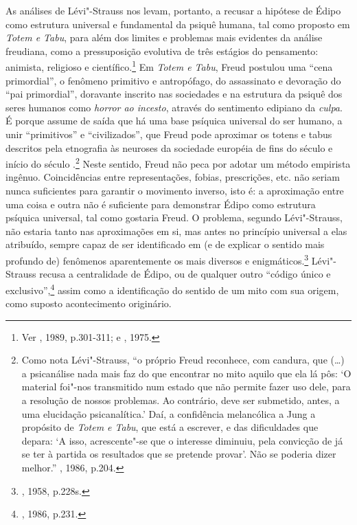 As análises de Lévi"-Strauss nos levam, portanto, a recusar a hipótese de
Édipo como estrutura universal e fundamental da psiquê humana, tal como
proposto em \emph{Totem e Tabu}, para além dos limites e problemas mais
evidentes da análise freudiana, como a pressuposição evolutiva de três
estágios do pensamento: animista, religioso e científico.\footnote{Ver
  , 1989, p.301-311; e , 1975.} Em \emph{Totem e Tabu}, Freud
postulou uma ``cena primordial'', o fenômeno primitivo e antropófago, do
assassinato e devoração do ``pai primordial'', doravante inscrito nas
sociedades e na estrutura da psiquê dos seres humanos como \emph{horror
ao incesto}, através do sentimento edipiano da \emph{culpa}. É porque
assume de saída que há uma base psíquica universal do ser humano, a unir
``primitivos'' e ``civilizados'', que Freud pode aproximar os totens e
tabus descritos pela etnografia às neuroses da sociedade européia de
fins do século  e início do século .\footnote{Como nota
  Lévi"-Strauss, ``o próprio Freud reconhece, com candura, que (\ldots{}) a
  psicanálise nada mais faz do que encontrar no mito aquilo que ela lá
  pôs: `O material foi"-nos transmitido num estado que não permite fazer
  uso dele, para a resolução de nossos problemas. Ao contrário, deve ser
  submetido, antes, a uma elucidação psicanalítica.' Daí, a confidência
  melancólica a Jung a propósito de \emph{Totem e Tabu}, que está a
  escrever, e das dificuldades que depara: `A isso, acrescente"-se que o
  interesse diminuiu, pela convicção de já se ter à partida os
  resultados que se pretende provar'. Não se poderia dizer melhor.''
  , 1986, p.204.} Neste sentido, Freud não peca por adotar
um método empirista ingênuo. Coincidências entre representações, fobias,
prescrições, etc. não seriam nunca suficientes para garantir o movimento
inverso, isto é: a aproximação entre uma coisa e outra não é suficiente
para demonstrar Édipo como estrutura psíquica universal, tal como
gostaria Freud. O problema, segundo Lévi"-Strauss, não estaria tanto nas
aproximações em si, mas antes no princípio universal a elas atribuído,
sempre capaz de ser identificado em (e de explicar o sentido mais
profundo de) fenômenos aparentemente os mais diversos e
enigmáticos.\footnote{, 1958, p.228s.} Lévi"-Strauss recusa a
centralidade de Édipo, ou de qualquer outro ``código único e
exclusivo'',\footnote{, 1986, p.231.} assim como a
identificação do sentido de um mito com sua origem, como suposto
acontecimento originário.

